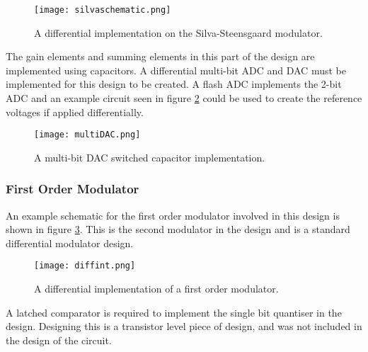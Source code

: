         \begin{figure}
            \begin{center}
            \texttt{[image: silvaschematic.png]}
            \caption{A differential implementation on the Silva-Steensgaard modulator.}
            \label{fig:silvaschematic}
            \end{center}
        \end{figure}

        The gain elements and summing elements in this part of the design are implemented using capacitors.
        A differential multi-bit ADC and DAC must be implemented for this design to be created.
        A flash ADC implements the 2-bit ADC and an example circuit seen in figure \ref{fig:multiDAC} could be used to create the reference voltages if applied differentially.

        \begin{figure}
            \begin{center}
            \texttt{[image: multiDAC.png]}
            \caption{A multi-bit DAC switched capacitor implementation\cite{Henderson2013a}.}
            \label{fig:multiDAC}
            \end{center}
        \end{figure}       

        \subsubsection{First Order Modulator}
        An example schematic for the first order modulator involved in this design is shown in figure \ref{fig:diffint}.
        This is the second modulator in the design and is a standard differential modulator design.

        \begin{figure}
            \begin{center}
            \texttt{[image: diffint.png]}
            \caption{A differential implementation of a first order modulator\cite{Henderson2013a}.}
            \label{fig:diffint}
            \end{center}
        \end{figure}

        A latched comparator is required to implement the single bit quantiser in the design.
        Designing this is a transistor level piece of design, and was not included in the design of the circuit.

